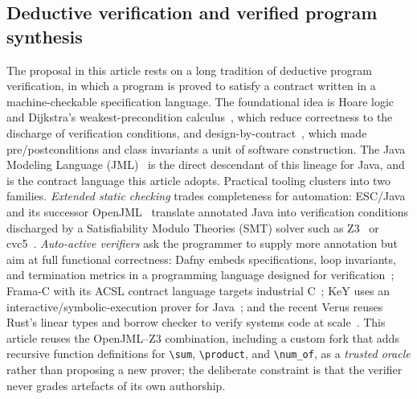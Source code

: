 \subsection{Deductive verification and verified program synthesis}
\label{subsec:rw5}

The proposal in this article rests on a long tradition of deductive program
verification, in which a program is proved to satisfy a contract written in a
machine-checkable specification language. The foundational idea is Hoare
logic~\cite{hoare1969axiomatic} and Dijkstra's weakest-precondition
calculus~\cite{dijkstra1975guarded}, which reduce correctness to the discharge
of verification conditions, and design-by-contract~\cite{meyer1992dbc}, which
made pre/postconditions and class invariants a unit of software construction.
The Java Modeling Language (JML)~\cite{leavens2006jml} is the direct descendant
of this lineage for Java, and is the contract language this article adopts.
Practical tooling clusters into two families. \emph{Extended static checking}
trades completeness for automation: ESC/Java~\cite{flanagan2002escjava} and its
successor OpenJML~\cite{cok2011openjml,cok2014openjml} translate annotated Java
into verification conditions discharged by a Satisfiability Modulo Theories
(SMT) solver such as Z3~\cite{demoura2008z3} or
cvc5~\cite{barbosa2022cvc5}. \emph{Auto-active verifiers} ask the programmer to
supply more annotation but aim at full functional correctness: Dafny embeds
specifications, loop invariants, and termination metrics in a programming
language designed for verification~\cite{leino2010dafny}; Frama-C with its ACSL
contract language targets industrial C~\cite{kirchner2015framac}; KeY uses an
interactive/symbolic-execution prover for Java~\cite{ahrendt2016key}; and the
recent Verus reuses Rust's linear types and borrow checker to verify systems
code at scale~\cite{lattuada2023verus}. This article reuses the OpenJML--Z3
combination, including a custom fork that adds recursive function definitions
for \verb|\sum|, \verb|\product|, and \verb|\num_of|, as a \emph{trusted oracle}
rather than proposing a new prover; the deliberate constraint is that the
verifier never grades artefacts of its own authorship.

